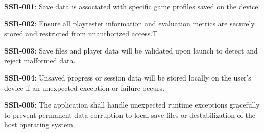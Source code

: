 \textbf{SSR-001}: Save data is associated with specific game profiles saved on the device.

\textbf{SSR-002}: Ensure all playtester information and evaluation metrics are securely stored and restricted from unauthorized access.T

\textbf{SSR-003}: Save files and player data will be validated upon launch to detect and reject malformed data.

\textbf{SSR-004}: Unsaved progress or session data will be stored locally on the user's device if an unexpected exception or failure occurs.

\textbf{SSR-005}: The application shall handle unexpected runtime exceptions gracefully to prevent permanent data corruption to local save files or destabilization of the host operating system.